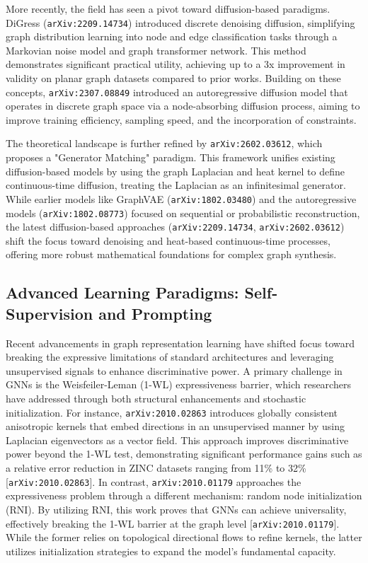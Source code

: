 \documentclass[11pt]{article}
\begin{document}
More recently, the field has seen a pivot toward diffusion-based paradigms. DiGress (\texttt{arXiv:2209.14734}) introduced discrete denoising diffusion, simplifying graph distribution learning into node and edge classification tasks through a Markovian noise model and graph transformer network. This method demonstrates significant practical utility, achieving up to a 3x improvement in validity on planar graph datasets compared to prior works. Building on these concepts, \texttt{arXiv:2307.08849} introduced an autoregressive diffusion model that operates in discrete graph space via a node-absorbing diffusion process, aiming to improve training efficiency, sampling speed, and the incorporation of constraints.

The theoretical landscape is further refined by \texttt{arXiv:2602.03612}, which proposes a "Generator Matching" paradigm. This framework unifies existing diffusion-based models by using the graph Laplacian and heat kernel to define continuous-time diffusion, treating the Laplacian as an infinitesimal generator. While earlier models like GraphVAE (\texttt{arXiv:1802.03480}) and the autoregressive models (\texttt{arXiv:1802.08773}) focused on sequential or probabilistic reconstruction, the latest diffusion-based approaches (\texttt{arXiv:2209.14734}, \texttt{arXiv:2602.03612}) shift the focus toward denoising and heat-based continuous-time processes, offering more robust mathematical foundations for complex graph synthesis.

\subsection{Advanced Learning Paradigms: Self-Supervision and Prompting}

Recent advancements in graph representation learning have shifted focus toward breaking the expressive limitations of standard architectures and leveraging unsupervised signals to enhance discriminative power. A primary challenge in GNNs is the Weisfeiler-Leman (1-WL) expressiveness barrier, which researchers have addressed through both structural enhancements and stochastic initialization. For instance, \texttt{arXiv:2010.02863} introduces globally consistent anisotropic kernels that embed directions in an unsupervised manner by using Laplacian eigenvectors as a vector field. This approach improves discriminative power beyond the 1-WL test, demonstrating significant performance gains such as a relative error reduction in ZINC datasets ranging from 11\% to 32\% [\texttt{arXiv:2010.02863}]. In contrast, \texttt{arXiv:2010.01179} approaches the expressiveness problem through a different mechanism: random node initialization (RNI). By utilizing RNI, this work proves that GNNs can achieve universality, effectively breaking the 1-WL barrier at the graph level [\texttt{arXiv:2010.01179}]. While the former relies on topological directional flows to refine kernels, the latter utilizes initialization strategies to expand the model's fundamental capacity.
\end{document}
